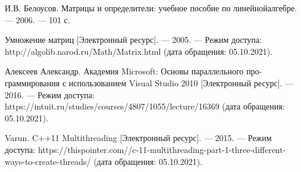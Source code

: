 \begin{thebibliography}{9}
    \label{cha:biblio}
    
     И.В. Белоусов. Матрицы и определители: учебное пособие по линейнойалгебре. — 2006. — 101 с.
    
     Умножение матриц [Электронный ресурс]. — 2005. — Режим до­ступа: http://algolib.narod.ru/Math/Matrix.html (дата обращения: 05.10.2021).

     Алексеев Александр. Академия Microsoft: Основы параллельного про­граммирования с использованием Visual Studio 2010 [Электронный ресурс]. — 2016. — Режим доступа: https://intuit.ru/studies/courses/4807/1055/lecture/16369 (дата обращения: 05.10.2021).

     Varun. C++11 Multithreading [Электронный ре­сурс]. — 2015. — Режим доступа: https://thispointer.com//c-11-multithreading-part-1-three-different-ways-to-create-threads/ (дата обращения: 05.10.2021).

\end{thebibliography}
